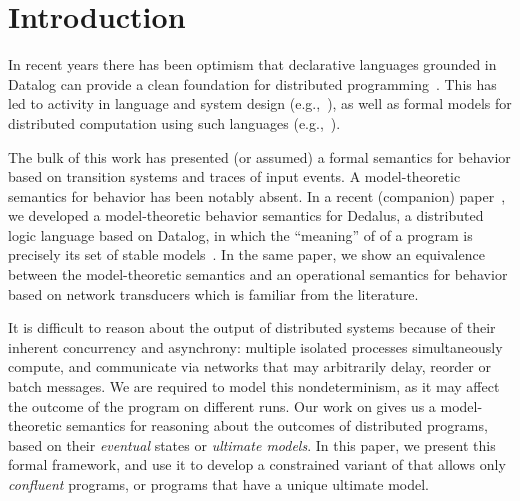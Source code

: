 \section{Introduction}

In recent years there has been optimism that declarative languages grounded in
Datalog can provide a clean foundation for distributed
programming~\cite{declarative-imperative}.  This has led to activity in language
and system design (e.g.,~\cite{boom,Belaramani:2009,Chu:2007,Loo2009-CACM}), as well as formal
models for distributed computation using such
languages (e.g.,~\cite{relational-transducers,navarro-oper-sem,card-abstraction}).

The bulk of this work has presented (or assumed) a formal semantics for behavior based on transition systems
and traces of input events.  A model-theoretic semantics for behavior has been notably absent.
In a recent (companion) paper~\cite{ameloot-operational}, we developed a model-theoretic behavior
semantics for Dedalus, a distributed logic language based on Datalog, in which the ``meaning''
of of a program is precisely its set of stable models~\cite{sacca-zaniolo}. %
In the same paper, we show an equivalence between the model-theoretic semantics and an operational semantics for behavior based on network transducers which is familiar from the literature.

It is difficult to reason about the output of distributed systems because of their inherent concurrency and asynchrony: multiple 
isolated processes simultaneously compute, and communicate via networks that may arbitrarily delay, reorder or batch messages.
We are required to model this nondeterminism, as it may affect the outcome of the program on different runs.  Our work on
\lang gives us a model-theoretic semantics for reasoning about the outcomes of distributed programs, based on their \emph{eventual} states or \emph{ultimate models}.  In this paper, we present this formal framework, and use it to develop a constrained variant
of \lang that allows only \emph{confluent} programs, or programs that have a unique ultimate model.

